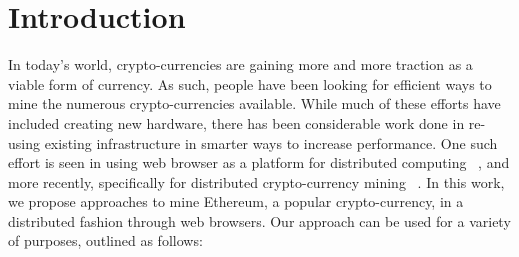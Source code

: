 \documentclass[runningheads]{llncs}
\begin{document}
\section{Introduction}
In today's world, crypto-currencies are gaining more and more traction as a viable form of currency. As such, people have been looking for efficient ways to mine the numerous crypto-currencies available. While much of these efforts have included creating new hardware, there has been considerable work done in re-using existing infrastructure in smarter ways to increase performance. One such effort is seen in using web browser as a platform for distributed computing ~\cite{Cushing}, and more recently, specifically for distributed crypto-currency mining ~\cite{coinhive}. In this work, we propose approaches to mine Ethereum, a popular crypto-currency, in a distributed fashion through web browsers. Our approach can be used for a variety of purposes, outlined as follows: 
\end{document}
